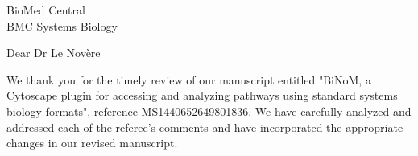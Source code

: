 \documentclass[11pt]{letter}
\date{}
\begin{document}
 \begin{letter}{BioMed Central \\ BMC Systems Biology}%
 \opening{Dear Dr Le Novère}%

We thank you for the timely review of our manuscript entitled "BiNoM, a
Cytoscape plugin for accessing and analyzing pathways using standard systems
biology formats", reference MS1440652649801836. We have carefully analyzed and addressed each of the
referee's comments and have incorporated the appropriate changes in our revised
manuscript.







 \end{letter}
 
\end{document}
